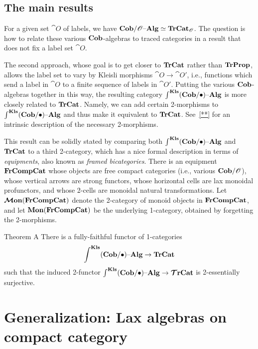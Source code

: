 \documentclass[12pt,oneside,article,draft]{memoir}
\begin{document}
\subsection{The main results}

For a given set $\cat{O}$ of labels, we have $\mathbf{Cob}/\mathscr{O}{\text \textendash}\mathbf{Alg}\simeq\mathbf{TrCat}_{\mathscr{O}}$.  The question
is how to relate these various $\mathbf{Cob}$-algebras to traced categories in a result that does not fix a
label set $\cat{O}$.

The second approach, whose goal is to get closer to $\mathbf{TrCat}$ rather than $\mathbf{TrProp}$, allows the label
set to vary by Kleisli morphisms $\cat{O}\to\cat{O'}$, i.e., functions which send a label in
$\cat{O}$ to a finite sequence of labels in $\cat{O'}$.  Putting the various $\mathbf{Cob}$-algebras
together in this way, the resulting category $\int^{\mathbf{Kls}}(\mathbf{Cob}/\bullet){\text \textendash}\mathbf{Alg}$ is more closely related to $\mathbf{TrCat}$.
Namely, we can add certain 2-morphisms to $\int^{\mathbf{Kls}}(\mathbf{Cob}/\bullet){\text \textendash}\mathbf{Alg}$ and thus make it equivalent to $\mathbf{TrCat}$.
See~\ref{**} for an intrinsic description of the necessary 2-morphisms.

This result can be solidly stated by comparing both $\int^{\mathbf{Kls}}(\mathbf{Cob}/\bullet){\text \textendash}\mathbf{Alg}$ and $\mathbf{TrCat}$ to a third 2-category,
which has a nice formal description in terms of \emph{equipments}, also known as \emph{framed
bicategories}.  There is an equipment $\mathbf{FrCompCat}$ whose objects are free compact categories
(i.e., various $\mathbf{Cob}/\mathscr{O}$), whose vertical arrows are strong functors, whose horizontal cells
are lax monoidal profunctors, and whose 2-cells are monoidal natural transformations.  Let
$\bm{\mathcal{M}}\mathbf{on}(\mathbf{FrCompCat})$ denote the 2-category of monoid objects in $\mathbf{FrCompCat}$, and let
$\mathbf{Mon}(\mathbf{FrCompCat})$ be the underlying 1-category, obtained by forgetting the 2-morphisms.

\begin{named}{Theorem A}
   There is a fully-faithful functor of 1-categories
   \begin{equation*}
      \int^{\mathbf{Kls}}(\mathbf{Cob}/\bullet){\text \textendash}\mathbf{Alg} \to \mathbf{TrCat}
   \end{equation*}
   such that the induced 2-functor $\int^{\mathbf{Kls}}(\mathbf{Cob}/\bullet){\text \textendash}\mathbf{Alg}\to\bm{\mathcal{T}}\mathbf{rCat}$ is 2-essentially surjective.
\end{named}


\section{Generalization: Lax algebras on compact category}
\end{document}
